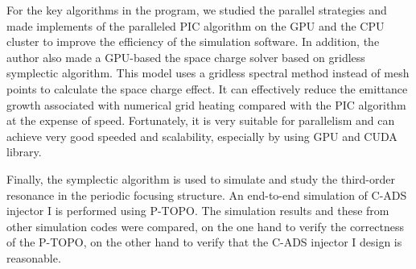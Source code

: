 For the key algorithms in the program, we studied the parallel strategies
and made implements of the paralleled PIC algorithm on the GPU and the CPU cluster
to improve the efficiency of the simulation software.
In addition, the author also made a GPU-based the space charge solver based on gridless symplectic algorithm.
This model uses a gridless spectral method instead of mesh points to calculate the space charge effect.
It can effectively reduce the emittance growth associated with numerical grid heating compared with the PIC algorithm at the expense of speed.
Fortunately, it is very suitable for parallelism and can achieve very good speeded and scalability, especially by using GPU and CUDA library.

Finally, the symplectic algorithm is used to simulate and study the third-order resonance in the periodic focusing structure.
An end-to-end simulation of C-ADS injector I is performed using P-TOPO.
The simulation results and these from other simulation codes were compared, on the one hand to verify the correctness of the P-TOPO, on the other hand to verify that the C-ADS injector I design is reasonable.



